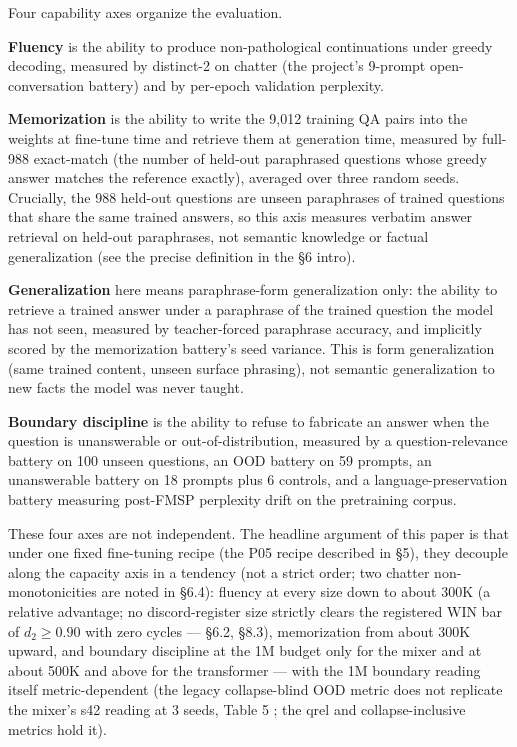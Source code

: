 \documentclass[11pt]{article}
\begin{document}
Four capability axes organize the evaluation.

\textbf{Fluency} is the ability to produce non-pathological continuations under greedy decoding, measured by distinct-2 on chatter (the project's 9-prompt open-conversation battery) and by per-epoch validation perplexity.

\textbf{Memorization} is the ability to write the 9,012 training QA pairs into the weights at fine-tune time and retrieve them at generation time, measured by full-988 exact-match (the number of held-out paraphrased questions whose greedy answer matches the reference exactly), averaged over three random seeds. Crucially, the 988 held-out questions are unseen paraphrases of trained questions that share the same trained answers, so this axis measures verbatim answer retrieval on held-out paraphrases, not semantic knowledge or factual generalization (see the precise definition in the \S6 intro).

\textbf{Generalization} here means paraphrase-form generalization only: the ability to retrieve a trained answer under a paraphrase of the trained question the model has not seen, measured by teacher-forced paraphrase accuracy, and implicitly scored by the memorization battery's seed variance. This is form generalization (same trained content, unseen surface phrasing), not semantic generalization to new facts the model was never taught.

\textbf{Boundary discipline} is the ability to refuse to fabricate an answer when the question is unanswerable or out-of-distribution, measured by a question-relevance battery on 100 unseen questions, an OOD battery on 59 prompts, an unanswerable battery on 18 prompts plus 6 controls, and a language-preservation battery measuring post-FMSP perplexity drift on the pretraining corpus.

These four axes are not independent. The headline argument of this paper is that under one fixed fine-tuning recipe (the P05 recipe described in \S5), they decouple along the capacity axis in a tendency (not a strict order; two chatter non-monotonicities are noted in \S6.4): fluency at every size down to about 300K (a relative advantage; no discord-register size strictly clears the registered WIN bar of $d_2 \geq 0.90$ with zero cycles --- \S6.2, \S8.3), memorization from about 300K upward, and boundary discipline at the 1M budget only for the mixer and at about 500K and above for the transformer --- with the 1M boundary reading itself metric-dependent (the legacy collapse-blind OOD metric does not replicate the mixer's s42 reading at 3 seeds, Table 5 \textdagger; the qrel and collapse-inclusive metrics hold it).
\end{document}
